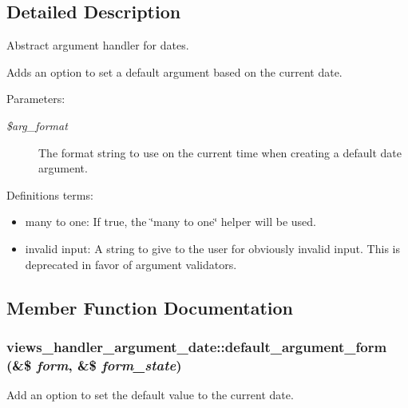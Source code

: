 \subsection{Detailed Description}
Abstract argument handler for dates.

Adds an option to set a default argument based on the current date.

\begin{Desc}
\item[Parameters:]
\begin{description}
\item[{\em \$arg\_\-format}]The format string to use on the current time when creating a default date argument.\end{description}
\end{Desc}
Definitions terms:\begin{itemize}
\item many to one: If true, the \char`\"{}many to one\char`\"{} helper will be used.\item invalid input: A string to give to the user for obviously invalid input. This is deprecated in favor of argument validators. 
\end{itemize}


\subsection{Member Function Documentation}
\hypertarget{classviews__handler__argument__date_9c6775f6c034bfcec9cd0fe0ab0e96f2}{
\subsubsection[{default\_\-argument\_\-form}]{\setlength{\rightskip}{0pt plus 5cm}views\_\-handler\_\-argument\_\-date::default\_\-argument\_\-form (\&\$ {\em form}, \/  \&\$ {\em form\_\-state})}}
\label{classviews__handler__argument__date_9c6775f6c034bfcec9cd0fe0ab0e96f2}


Add an option to set the default value to the current date. 

